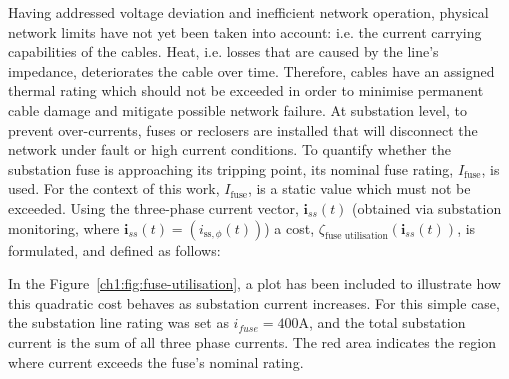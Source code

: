 
Having addressed voltage deviation and inefficient network operation, physical network limits have not yet been taken into account: i.e. the current carrying capabilities of the cables.
Heat, i.e. losses that are caused by the line's impedance, deteriorates the cable over time.
Therefore, cables have an assigned thermal rating which should not be exceeded in order to minimise permanent cable damage and mitigate possible network failure.
At substation level, to prevent over-currents, fuses or reclosers are installed that will disconnect the network under fault or high current conditions.
To quantify whether the substation fuse is approaching its tripping point, its nominal fuse rating, $I_\text{fuse}$, is used.
For the context of this work, $I_\text{fuse}$, is a static value which must not be exceeded.
Using the three-phase current vector, $\textbf{i}_{ss}(t)$ (obtained via substation monitoring, where $\textbf{i}_{ss}(t) = (i_{\text{ss},\phi}(t))$) a cost, $\zeta_\text{fuse utilisation}(\textbf{i}_{ss}(t))$, is formulated, and defined as follows:



In the Figure~\ref{ch1:fig:fuse-utilisation}, a plot has been included to illustrate how this quadratic cost behaves as substation current increases.
For this simple case, the substation line rating was set as $i_{fuse}=400\text{A}$, and the total substation current is the sum of all three phase currents.
The red area indicates the region where current exceeds the fuse's nominal rating.




